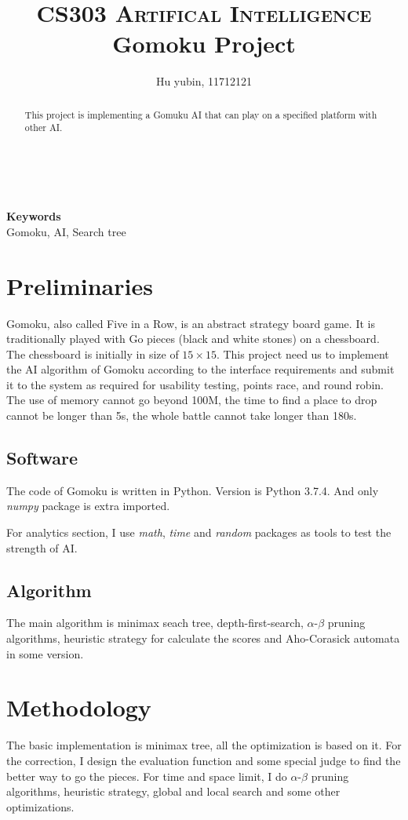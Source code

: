 \documentclass[10pt,twocolumn,letterpaper]{article}
\title{
		\usefont{OT1}{bch}{b}{n}
		\normalfont \normalsize \textsc{CS303 Artifical Intelligence} \\ [10pt]
		\huge Gomoku Project \\
}
\author[1]{Hu yubin, 11712121}
\affil[1]{\small{Department of Computer Science and Engineering, Southern University of Science and Technology}}
\begin{document}
\maketitle

\begin{abstract}
This project is implementing a Gomuku AI that can play on a specified platform with other AI.
\end{abstract} \\ 
\\ 
{\textbf{Keywords} \\
Gomoku, AI, Search tree }

\section{Preliminaries}
Gomoku, also called Five in a Row, is an abstract strategy board game. It is traditionally played with Go pieces (black and white stones) on a chessboard. The chessboard is initially in size of $15 \times 15$\cite{Case1971Gomoku}. This project need us to implement the AI algorithm of Gomoku according to the interface requirements and submit it to the system as required for usability testing, points race, and round robin. The use of memory cannot go beyond 100M, the time to find a place to drop cannot be longer than 5s, the whole battle cannot take longer than 180s.

\subsection{Software}
The code of Gomoku is written in Python. Version is Python 3.7.4. And only \emph{numpy} package is extra imported.

For analytics section, I use \emph{math}, \emph{time} and \emph{random} packages as tools to test the strength of AI.

\subsection{Algorithm}
The main algorithm is minimax seach tree, depth-first-search, $\alpha$-$\beta$ pruning algorithms, heuristic strategy for calculate the scores and Aho-Corasick automata\cite{Aho1975Efficient} in some version.

\section{Methodology}
The basic implementation is minimax tree, all the optimization is based on it. For the correction, I design the evaluation function and some special judge to find the better way to go the pieces. For time and space limit, I do $\alpha$-$\beta$ pruning algorithms,  heuristic strategy, global and local search\cite{M2001Global} and some other optimizations. 
\end{document}
